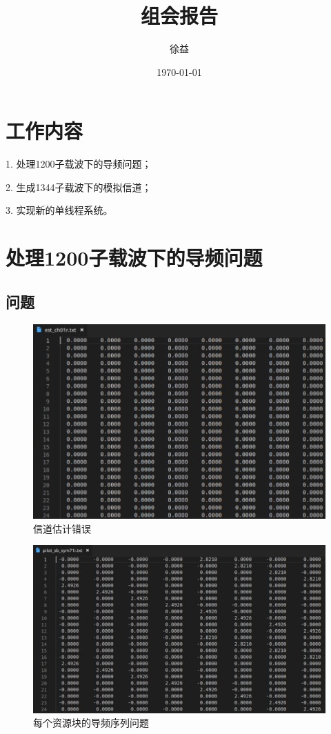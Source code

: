 \documentclass{article}
\title{组会报告}
\author{徐益}
\date{\today}
\begin{document}
\maketitle


\section{工作内容} 
1. 处理1200子载波下的导频问题；

2. 生成1344子载波下的模拟信道；

3. 实现新的单线程系统。

\section{处理1200子载波下的导频问题}
\subsection{问题}
\begin{figure}[H]
	\centering
	\includegraphics[width = .8\textwidth]{errch.png}
	\caption{信道估计错误}
\end{figure}
\begin{figure}[H]
	\centering
	\includegraphics[width = .8\textwidth]{errpilot.png}
	\caption{每个资源块的导频序列问题}
\end{figure}
\end{document}
